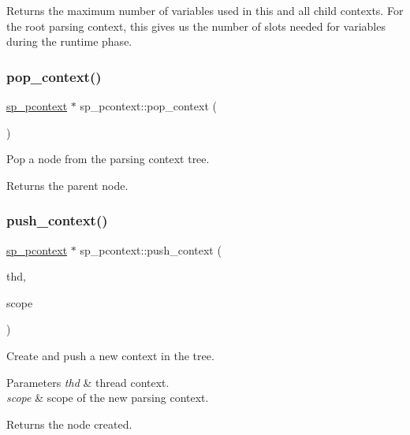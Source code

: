 \begin{DoxyReturn}{Returns}
the maximum number of variables used in this and all child contexts. For the root parsing context, this gives us the number of slots needed for variables during the runtime phase. 
\end{DoxyReturn}
\mbox{\label{classsp__pcontext_ae7e4af2bd11d58a2950462a490612a31}} 
\subsubsection{\texorpdfstring{pop\+\_\+context()}{pop\_context()}}
{\footnotesize\ttfamily \mbox{\hyperlink{classsp__pcontext}{sp\+\_\+pcontext}} $\ast$ sp\+\_\+pcontext\+::pop\+\_\+context (\begin{DoxyParamCaption}{ }\end{DoxyParamCaption})}

Pop a node from the parsing context tree. \begin{DoxyReturn}{Returns}
the parent node. 
\end{DoxyReturn}
\mbox{\label{classsp__pcontext_a486b4feb63c343fea40adcf197bde017}} 
\subsubsection{\texorpdfstring{push\+\_\+context()}{push\_context()}}
{\footnotesize\ttfamily \mbox{\hyperlink{classsp__pcontext}{sp\+\_\+pcontext}} $\ast$ sp\+\_\+pcontext\+::push\+\_\+context (\begin{DoxyParamCaption}\item[{T\+HD $\ast$}]{thd,  }\item[{\mbox{\hyperlink{classsp__pcontext_a6252258e34c191cbf1b5e86628cd29c6}{sp\+\_\+pcontext\+::enum\+\_\+scope}}}]{scope }\end{DoxyParamCaption})}



Create and push a new context in the tree. 


\begin{DoxyParams}{Parameters}
{\em thd} & thread context. \\
\hline
{\em scope} & scope of the new parsing context. \\
\hline
\end{DoxyParams}
\begin{DoxyReturn}{Returns}
the node created. 
\end{DoxyReturn}
\mbox{\label{classsp__pcontext_ab7f7fdb12f7e3c0e9cfea81e4ee39c66}} 

